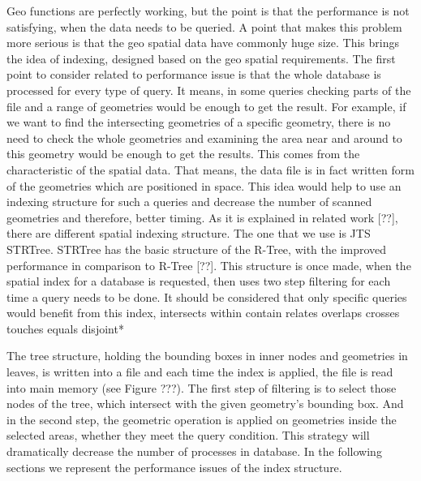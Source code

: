 Geo functions are perfectly working, but the point is that the performance is not satisfying, when the  data needs to be queried. A point that makes this problem more serious is that the geo spatial data have commonly huge size. This brings the idea of indexing, designed based on the geo spatial requirements.
The first point to consider related to performance issue is that the whole database is processed for every type of query. It means, in some queries checking parts of the file and a range of geometries would be enough to get the result. For example, if we want to find the intersecting geometries of a specific geometry, there is no need to check the whole geometries and examining the area near and around to this geometry would be enough to get the results. This comes from the characteristic of the spatial data. That means, the data file is in fact written form of the geometries which are positioned in space. 
This idea would help to use an indexing structure for such a queries and decrease the number of scanned geometries and therefore, better timing.
As it is explained in related work [??], there are different spatial indexing structure. The one that we use is JTS STRTree. STRTree has the basic structure of the R-Tree, with the improved performance in comparison to R-Tree [??]. This structure is once made, when the spatial index for a database is requested, then uses two step filtering for each time a query needs to be done. It should be considered that only specific queries would benefit from this index,
intersects
within
contain
relates 
overlaps
crosses
touches
equals
disjoint*

The tree structure, holding the bounding boxes in inner nodes and geometries in leaves, is written into a file and each time the index is applied, the file is read into main memory (see Figure ???). The first step of filtering is to select those nodes of the tree, which intersect with the given geometry's bounding box. And in the second step, the geometric operation is applied on geometries inside the selected areas, whether they meet the query condition. This strategy will dramatically decrease the number of processes in database. In the following sections we represent the performance issues of the index structure.

